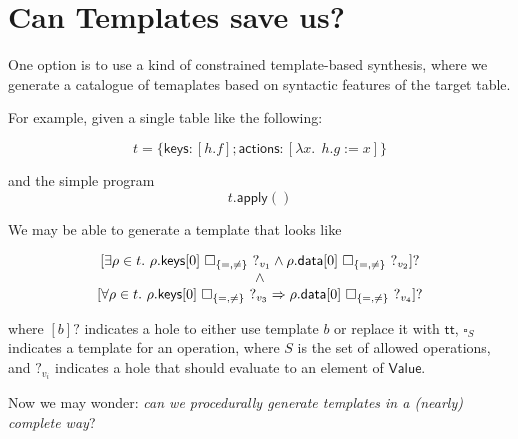 \documentclass{article}
\newcommand{\TRUE}{\mathsf{tt}}
\newcommand{\Value}{\mathsf{Value}}
\newcommand{\actions}{\mathsf{actions}}
\newcommand{\keys}{\mathsf{keys}}
\newcommand{\data}{\mathsf{data}}
\newcommand{\apply}{\mathsf{apply}}
\begin{document}
\section{Can Templates save us?}

One option is to use a kind of constrained template-based synthesis, where we
generate a catalogue of temaplates based on syntactic features of the target table.

For example, given a single table like the following:

\[t = \{\keys: [h.f]; \actions: [\lambda x.~~h.g:= x]\}\]

and the simple program \[t.\apply()\]

We may be able to generate a template that looks like

\[\begin{array}{>{\displaystyle}c}
  {[\exists \rho \in t.~ \rho.\keys[0]~\square_{\{=,\neq\}}~?_{v_1}\wedge \rho.\data[0]~\square_{\{=,\neq\}}~?_{v_2} ]?} \\
  \wedge\\
  {[\forall \rho \in t.~\rho.\keys[0]~\square_{\{=,\neq\}}~?_{v_3} \Rightarrow \rho.\data[0]~\square_{\{=,\neq\}}~?_{v_4}]?}
\end{array}\]

where $[b]?$ indicates a hole to either use template $b$ or replace it with
$\TRUE$, $\square_S$ indicates a template for an operation, where $S$ is the set
of allowed operations, and $?_{v_i}$ indicates a hole that should evaluate to an element
of $\Value$.

Now we may wonder: \emph{can we procedurally generate templates in a (nearly) complete way}?
\end{document}
